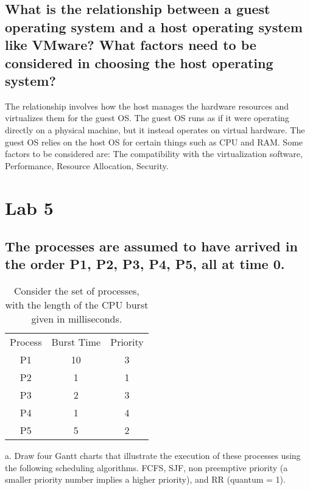 \documentclass[letterpaper, 10pt,DIV=13]{scrartcl}
\numberwithin{equation}{section} %
\numberwithin{figure}{section} %
\numberwithin{table}{section} %
\begin{document}
\subsection{What is the relationship between a guest operating system and a host operating system like VMware? What factors need to be considered in choosing the host operating system?}
The relationship involves how the host manages the hardware resources and virtualizes them for the guest OS. The guest OS runs as if it were operating directly on a physical machine, but it instead operates on virtual hardware. The guest OS relies on the host OS for certain things such as CPU and RAM. Some factors to be considered are: 
The compatibility with the virtualization software, 
Performance,
Resource Allocation,
Security.



\pagebreak

\section{Lab 5}
\subsection{The processes are assumed to have arrived in the order P1, P2, P3, P4, P5, all at time 0.}

\begin{table}[h]
    \centering
    \begin{tabular}{ccc}
        Process &Burst Time  &Priority \\
        P1 &10 &3\\
        P2 &1  &1 \\
        P3 &2  &3 \\
        P4 &1  &4 \\
        P5 &5  &2 \\
    \end{tabular}
    \caption{Consider the set of processes, with the length of the CPU burst given in milliseconds.}
    \label{tab:my_label}
\end{table}


a. Draw four Gantt charts that illustrate the execution of these processes using the following scheduling algorithms. FCFS, SJF, non preemptive priority (a smaller priority number implies a higher priority), and RR (quantum = 1).\\
\end{document}
